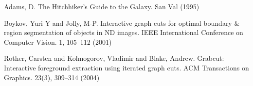\documentclass[runningheads,a4paper]{llncs}
\begin{document}
%
%

\begin{thebibliography}{4}
 Adams, D. The Hitchhiker's Guide to the Galaxy. San Val (1995)

 Boykov, Yuri Y and Jolly, M-P. Interactive graph cuts for optimal boundary \& region segmentation of objects in ND images. IEEE International Conference on Computer Vision. 1, 105--112 (2001)

 Rother, Carsten and Kolmogorov, Vladimir and Blake, Andrew. Grabcut: Interactive foreground extraction using iterated graph cuts. ACM Transactions on Graphics. 23(3), 309--314 (2004)
\end{thebibliography}
\end{document}

